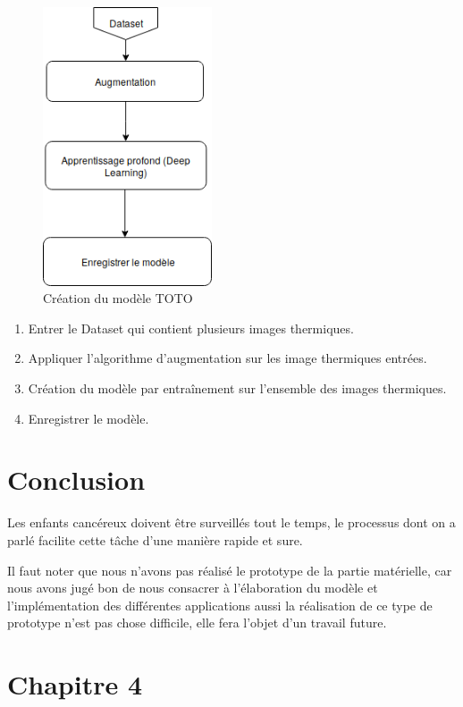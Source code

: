 \documentclass[12pt]{article}
\begin{document}
\begin{figure}[h]
	\centering
	\includegraphics[width=5cm]{img-Chapiter-3/modele1.png}
	\caption{Création du modèle TOTO}
	\label{fig:achdelasolu2}
\end{figure}

\begin{enumerate}
	\item Entrer le Dataset qui contient plusieurs images thermiques.
	\item Appliquer l'algorithme d'augmentation sur les image thermiques entrées.
	\item Création du modèle par entraînement sur l'ensemble des images thermiques.
	\item Enregistrer le modèle.
\end{enumerate}
\newpage


\newpage
\section{Conclusion}
Les enfants cancéreux doivent être surveillés tout le temps, le processus dont on a parlé facilite cette tâche d’une manière rapide et sure. 

Il faut noter que nous n'avons pas réalisé le prototype de la partie matérielle, car nous avons jugé bon de nous consacrer à l'élaboration du modèle et l'implémentation des différentes applications aussi la réalisation de ce type de prototype n'est pas chose difficile, elle fera l'objet d'un travail future.

\newpage
\rhead{}
\section*{\Huge{Chapitre 4}}
\end{document}
